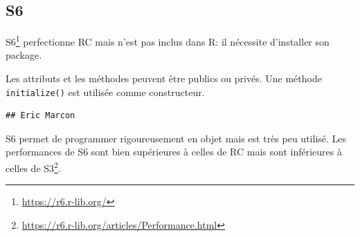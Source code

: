 \documentclass[
  11pt,
  french,
  a4paper,
  extrafontsizes,onecolumn,openright
  ]{memoir}
\newenvironment{Shaded}{\begin{snugshade}}{\end{snugshade}}
\newcommand{\AttributeTok}[1]{\textcolor[rgb]{0.77,0.63,0.00}{#1}}
\newcommand{\ConstantTok}[1]{\textcolor[rgb]{0.00,0.00,0.00}{#1}}
\newcommand{\ControlFlowTok}[1]{\textcolor[rgb]{0.13,0.29,0.53}{\textbf{#1}}}
\newcommand{\FunctionTok}[1]{\textcolor[rgb]{0.00,0.00,0.00}{#1}}
\newcommand{\NormalTok}[1]{#1}
\newcommand{\OtherTok}[1]{\textcolor[rgb]{0.56,0.35,0.01}{#1}}
\newcommand{\SpecialCharTok}[1]{\textcolor[rgb]{0.00,0.00,0.00}{#1}}
\newcommand{\StringTok}[1]{\textcolor[rgb]{0.31,0.60,0.02}{#1}}
\begin{document}
\hypertarget{s6}{%
\subsection{S6}\label{s6}}

S6\footnote{\url{https://r6.r-lib.org/}} perfectionne RC mais n'est pas inclus dans R: il nécessite d'installer son package.

Les attributs et les méthodes peuvent être publics ou privés.
Une méthode \texttt{initialize()} est utilisée comme constructeur.

\scriptsize

\begin{Shaded}
\end{Shaded}

\begin{verbatim}
## Eric Marcon
\end{verbatim}

\normalsize

S6 permet de programmer rigoureusement en objet mais est très peu utilisé.
Les performances de S6 sont bien supérieures à celles de RC mais sont inférieures à celles de S3\footnote{\url{https://r6.r-lib.org/articles/Performance.html}}.
\end{document}
